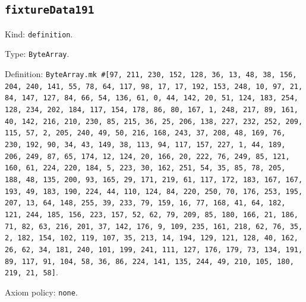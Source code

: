 \documentclass[11pt]{article}
\begin{document}
\subsection*{\texttt{fixtureData191}}
\noindent Kind: \texttt{definition}.\par
\noindent Type: \texttt{ByteArray}.\par
\noindent Definition: \texttt{ByteArray.mk \#[97, 211, 230, 152, 128, 36, 13, 48, 38, 156, 204, 240, 141, 55, 78, 64, 117, 98, 17, 17, 192, 153, 248, 10, 97, 21, 84, 147, 127, 84, 66, 54, 136, 61, 0, 44, 142, 20, 51, 124, 183, 254, 128, 234, 202, 184, 117, 154, 178, 86, 80, 167, 1, 248, 217, 89, 161, 40, 142, 216, 210, 230, 85, 215, 36, 25, 206, 138, 227, 232, 252, 209, 115, 57, 2, 205, 240, 49, 50, 216, 168, 243, 37, 208, 48, 169, 76, 230, 192, 90, 34, 43, 149, 38, 113, 94, 117, 157, 227, 1, 44, 189, 206, 249, 87, 65, 174, 12, 124, 20, 166, 20, 222, 76, 249, 85, 121, 160, 61, 224, 220, 184, 5, 223, 30, 162, 251, 54, 35, 85, 78, 205, 188, 48, 135, 200, 93, 165, 29, 171, 219, 61, 117, 172, 183, 167, 167, 193, 49, 183, 190, 224, 44, 110, 124, 84, 220, 250, 70, 176, 253, 195, 207, 13, 64, 148, 255, 39, 233, 79, 159, 16, 77, 168, 41, 64, 182, 121, 244, 185, 156, 223, 157, 52, 62, 79, 209, 85, 180, 166, 21, 186, 71, 82, 63, 216, 201, 37, 142, 176, 9, 109, 235, 161, 218, 62, 76, 35, 2, 182, 154, 102, 119, 107, 35, 213, 14, 194, 129, 121, 128, 40, 162, 26, 62, 34, 181, 240, 101, 199, 241, 111, 127, 176, 179, 73, 134, 191, 89, 117, 91, 104, 58, 36, 86, 224, 141, 135, 244, 49, 210, 105, 180, 219, 21, 58]}.\par
\noindent Axiom policy: \texttt{none}.\par
\end{document}
